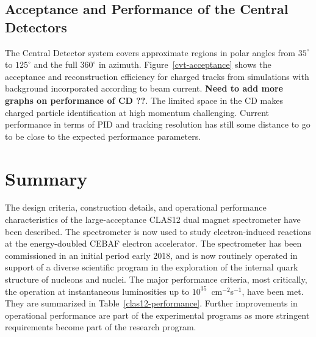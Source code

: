 \documentclass[final,3p,twocolumn]{elsarticle}
\begin{document}
\subsection{Acceptance and Performance of the Central Detectors} 

The Central Detector system covers approximate regions in polar angles from $35^\circ$ to $125^\circ$ and the full
$360^\circ$ in azimuth.  Figure~\ref{cvt-acceptance} shows the acceptance and reconstruction efficiency for charged
tracks from simulations with background incorporated according to beam current. {\bf Need to add more graphs on
performance of CD ??}. The limited space in the CD makes charged particle identification at high momentum challenging.
Current performance in terms of PID and tracking resolution has still some distance to go to be close to the expected
performance parameters.   

\section{Summary} 

The design criteria, construction details, and operational performance characteristics of the large-acceptance CLAS12
dual magnet spectrometer have been described. The spectrometer is now used to study electron-induced reactions at
the energy-doubled CEBAF electron accelerator. The spectrometer has been commissioned in an initial period early 2018,
and is now routinely operated in support of a diverse scientific program in the exploration of the internal quark structure
of nucleons and nuclei. The major performance criteria, most critically, the operation at  instantaneous luminosities up to 
$10^{35}$~cm$^{-2}$s$^{-1}$, have been met. They are summarized in Table~\ref{clas12-performance}. Further
improvements in operational performance are part of the experimental programs as more stringent requirements become
part of the research program.  

\vspace{0,5cm}


\vspace{0.3cm}
\end{document}
